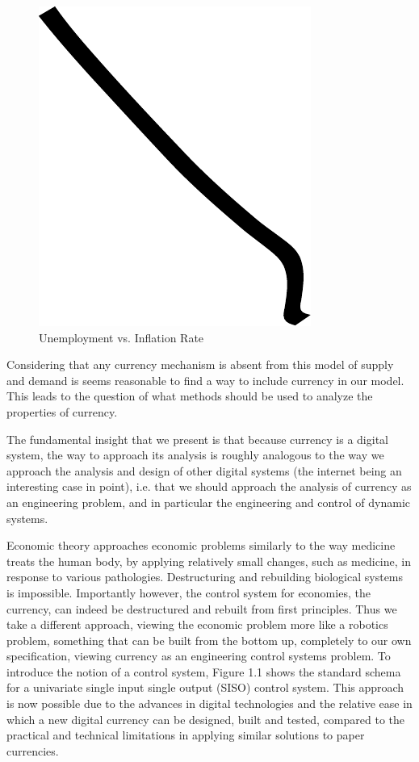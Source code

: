 \begin{figure}
\centering
\includegraphics{img/example.pdf}
\caption{Unemployment vs. Inflation Rate}
\end{figure}

Considering that any currency mechanism is absent from this model of supply and demand is seems
reasonable to find a way to include currency in our model. This leads to the question of what
methods should be used to analyze the properties of currency.

The fundamental insight that we present is that because currency is a digital system, the way to
approach its analysis is roughly analogous to the way we approach the analysis and design of other
digital systems (the internet being an interesting case in point), i.e. that we should approach the
analysis of currency as an engineering problem, and in particular the engineering and control of
dynamic systems. 

Economic theory approaches economic problems similarly to the way medicine treats the human body, by
applying relatively small changes, such as medicine, in response to various pathologies.
Destructuring and rebuilding biological systems is impossible. Importantly however, the control
system for economies, the currency, can indeed be destructured and rebuilt from first principles.
Thus we take a different approach, viewing the economic problem more like a robotics problem,
something that can be built from the bottom up, completely to our own specification, viewing
currency as an engineering control systems problem. To introduce the notion of a control system,
Figure 1.1 shows the standard schema for a univariate single input single output (SISO) control
system. This approach is now possible due to the advances in digital technologies and the relative
ease in which a new digital currency can be designed, built and tested, compared to the practical
and technical limitations in applying similar solutions to paper currencies.

